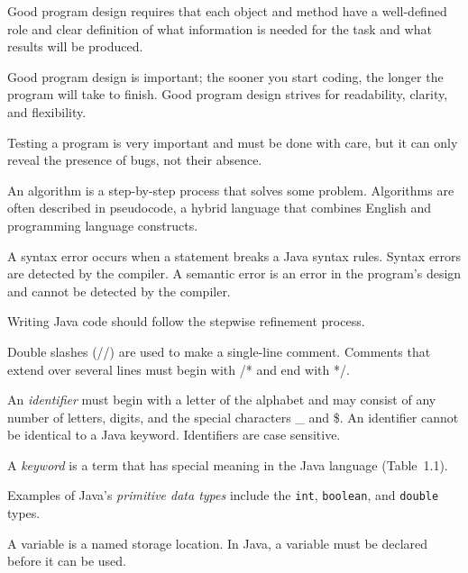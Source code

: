\begin{BL}

\item  Good program design requires that each object and method
have a well-defined role and clear definition of what information is needed
for the task and what results will be produced.

\item Good program design is important; the sooner you start coding, 
the longer the program will take to finish. Good program design
strives for readability, clarity, and flexibility.

\item  Testing a program is very important and must be done with
care, but it can only reveal the presence of bugs, not their absence.

\item  An algorithm is a step-by-step process that solves some
problem.  Algorithms are often described in pseudocode, a hybrid
language that combines English and programming language constructs.

\item  A syntax error occurs when a statement breaks a Java 
syntax rules.  Syntax errors are detected by the compiler.  A semantic
error is an error in the program's design and cannot be detected by
the compiler.

\item  Writing Java code should follow the stepwise refinement process.

\item Double slashes (//) are used to make a single-line comment.
Comments that extend over several lines must begin with /* and end
with */. 

\item  An {\it identifier} must begin with a letter of the
alphabet and may consist of any number of letters, digits, and the
special characters \_ and \$. An identifier cannot be identical to a
Java keyword. Identifiers are case sensitive.

\item  A {\it keyword} is a term that has special meaning in the
Java language (Table~1.1).

\item  Examples of Java's  {\it primitive data types} include
the {\tt int}, {\tt boolean}, and {\tt double} types. 

\item A variable is a named storage location. In Java, a 
variable must be declared before it can be used.


\end{BL}
